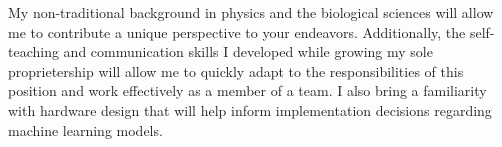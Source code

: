 \begin{cvletter}

	My non-traditional background in physics and the biological sciences
	will allow me to contribute a unique perspective to your endeavors.
	Additionally, the self-teaching and communication skills I developed
	while growing my sole proprietership will allow me to quickly adapt
	to the responsibilities of this position and work effectively
	as a member of a team. I also bring a familiarity with hardware
	design that will help inform implementation decisions regarding
	machine learning models.

\end{cvletter}
